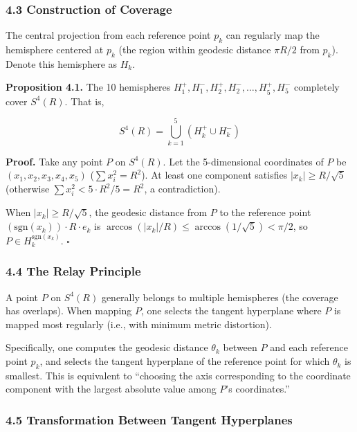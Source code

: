 \documentclass[a4paper,11pt]{article}
\begin{document}
\subsubsection{4.3 Construction of
Coverage}\label{construction-of-coverage}

The central projection from each reference point \(p_k\) can regularly
map the hemisphere centered at \(p_k\) (the region within geodesic
distance \(\pi R / 2\) from \(p_k\)). Denote this hemisphere as \(H_k\).

\textbf{Proposition 4.1.} The 10 hemispheres
\(H_1^+, H_1^-, H_2^+, H_2^-, \ldots, H_5^+, H_5^-\) completely cover
\(S^4(R)\). That is,

\[S^4(R) = \bigcup_{k=1}^{5} \left( H_k^+ \cup H_k^- \right)\]

\textbf{Proof.} Take any point \(P\) on \(S^4(R)\). Let the
5-dimensional coordinates of \(P\) be \((x_1, x_2, x_3, x_4, x_5)\)
(\(\sum x_i^2 = R^2\)). At least one component satisfies
\(|x_k| \geq R/\sqrt{5}\) (otherwise
\(\sum x_i^2 < 5 \cdot R^2/5 = R^2\), a contradiction).

When \(|x_k| \geq R/\sqrt{5}\), the geodesic distance from \(P\) to the
reference point \((\text{sgn}(x_k)) \cdot R \cdot e_k\) is
\(\arccos(|x_k|/R) \leq \arccos(1/\sqrt{5}) < \pi/2\), so
\(P \in H_k^{\text{sgn}(x_k)}\). \(\square\)

\subsubsection{4.4 The Relay Principle}\label{the-relay-principle}

A point \(P\) on \(S^4(R)\) generally belongs to multiple hemispheres
(the coverage has overlaps). When mapping \(P\), one selects the tangent
hyperplane where \(P\) is mapped most regularly (i.e., with minimum
metric distortion).

Specifically, one computes the geodesic distance \(\theta_k\) between
\(P\) and each reference point \(p_k\), and selects the tangent
hyperplane of the reference point for which \(\theta_k\) is smallest.
This is equivalent to ``choosing the axis corresponding to the
coordinate component with the largest absolute value among \(P\)'s
coordinates.''

\subsubsection{4.5 Transformation Between Tangent
Hyperplanes}\label{transformation-between-tangent-hyperplanes}
\end{document}
